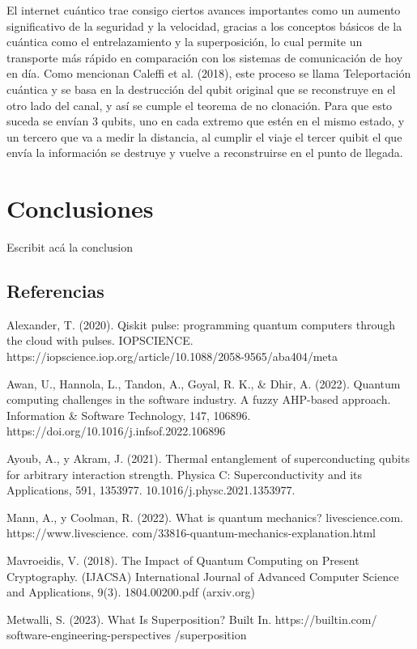 \documentclass{article}
\begin{document}
El internet cuántico trae consigo ciertos avances importantes como un aumento significativo de la seguridad y la velocidad, gracias a los conceptos básicos de la cuántica como el entrelazamiento y la superposición, lo cual permite un transporte más rápido en comparación con los sistemas de comunicación de hoy en día. Como mencionan Caleffi et al. (2018), este proceso se llama Teleportación cuántica y se basa en la destrucción del qubit original que se reconstruye en el otro lado del canal, y así se cumple el teorema de no clonación. Para que esto suceda se envían 3 qubits, uno en cada extremo que estén en el mismo estado, y un tercero que va a medir la distancia, al cumplir el viaje el tercer quibit el que envía la información se destruye y vuelve a reconstruirse en el punto de llegada. 


\newpage
\section{Conclusiones}
Escribit acá la conclusion



\clearpage

\subsection{Referencias}
Alexander, T. (2020). Qiskit pulse: programming quantum computers through the cloud with pulses. IOPSCIENCE. https://iopscience.iop.org/article/10.1088/2058-9565/aba404/meta

Awan, U., Hannola, L., Tandon, A., Goyal, R. K., & Dhir, A. (2022). Quantum computing challenges in the software industry. A fuzzy AHP-based approach. Information & Software Technology, 147, 106896. https://doi.org/10.1016/j.infsof.2022.106896

Ayoub, A., y Akram, J. (2021). Thermal entanglement of superconducting qubits for arbitrary interaction strength. Physica C: Superconductivity and its Applications, 591, 1353977. 10.1016/j.physc.2021.1353977.

Mann, A., y Coolman, R. (2022). What is quantum mechanics? livescience.com. 
https://www.livescience.
com/33816-quantum-mechanics-explanation.html

Mavroeidis, V. (2018). The Impact of Quantum Computing on Present Cryptography. (IJACSA) International Journal of Advanced Computer Science and Applications, 9(3). 
1804.00200.pdf (arxiv.org)

Metwalli, S. (2023). What Is Superposition? Built In. 
https://builtin.com/
software-engineering-perspectives
/superposition
\end{document}
